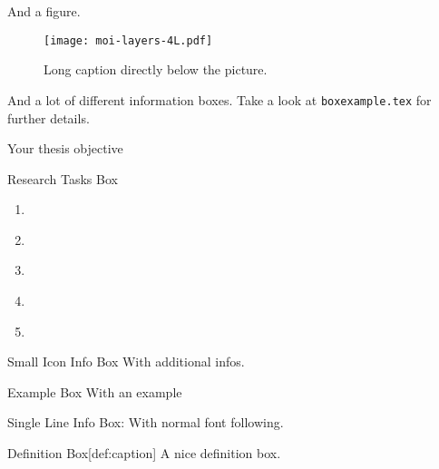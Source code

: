 And a figure.

\begin{figure}[t]
	\centering
	\texttt{[image: moi-layers-4L.pdf]}
	\caption[Short caption for the List of Figures.]{Long caption directly below the picture.}
	\label{fig:moi-layers-4l}
\end{figure}

\pagebreak
And a lot of different information boxes. Take a look at \verb|boxexample.tex| for further details.

\begin{thesisobjectivebox}
Your thesis objective
\end{thesisobjectivebox}

\begin{researchtaskbox}{Research Tasks Box}
\begin{enumerate}[label=\textbf{\Roman*}, labelsep=1em]
\setlength\itemsep{0.25em}
\item\label{rt:I} \lipsum[1][3]
\item\label{rt:II} \lipsum[1][4]
\item\label{rt:III} \lipsum[1][5]
\item\label{rt:IV} \lipsum[1][6]
\item\label{rt:V} \lipsum[1][7]
\end{enumerate}
\end{researchtaskbox}

\begin{infobox}{Small Icon Info Box}
With additional infos.
\end{infobox}

\begin{examplebox}{Example Box}
With an example
\end{examplebox}

\begin{examplebox}{Single Line Info Box: \normalfont\mdseries With normal font following.}
\vspace*{-0.165cm}
\end{examplebox}


\begin{definitionbox}{Definition Box}[def:caption]
A nice definition box.
\end{definitionbox}

